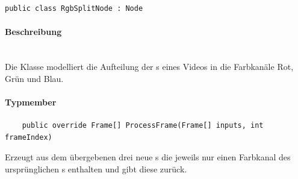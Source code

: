 \begin{verbatim}
public class RgbSplitNode : Node
\end{verbatim}

\paragraph{Beschreibung}~\\
Die Klasse  modelliert die Aufteilung der s eines Videos in die Farbkanäle Rot, Grün und Blau.

\paragraph{Typmember}
\begin{itemize}

	\begin{verbatim}
	public override Frame[] ProcessFrame(Frame[] inputs, int frameIndex)
	\end{verbatim}
	Erzeugt aus dem übergebenen  drei neue s die jeweils nur einen Farbkanal des ursprünglichen s enthalten und gibt diese zurück.
	
\end{itemize}
